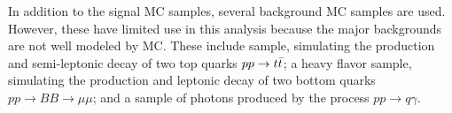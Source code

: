 In addition to the signal \ac{MC} samples, several background \ac{MC} samples are used. However, these have limited use in this analysis because the major backgrounds are not well modeled by \ac{MC}. These include \ttbar sample, simulating the production and semi-leptonic decay of two top quarks $pp\rightarrow t\bar{t}$; a heavy flavor sample, simulating the production and leptonic decay of two bottom quarks $pp\rightarrow BB \rightarrow \mu\mu$; and a sample of photons produced by the process $pp \rightarrow q \gamma$. 





